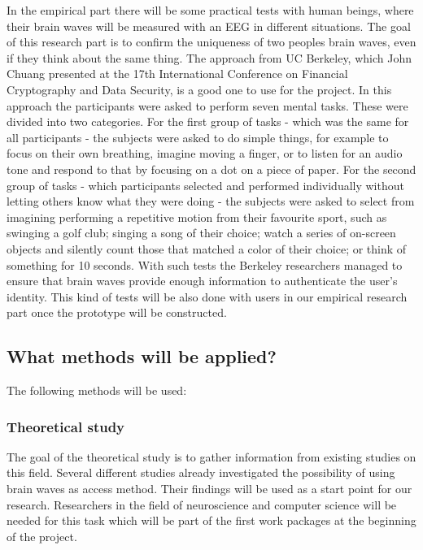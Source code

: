 In the empirical part there will be some practical tests with human beings, where their brain waves will be measured with an EEG in different situations. The goal of this research part is to confirm the uniqueness of two peoples brain waves, even if they think about the same thing. The approach from UC Berkeley, which John Chuang presented at the 17th International Conference on Financial Cryptography and Data Security, is a good one to use for the project. In this approach the participants were asked to perform seven mental tasks. These were divided into two categories. For the first group of tasks - which was the same for all participants - the subjects were asked to do simple things, for example to focus on their own breathing, imagine moving a finger, or to listen for an audio tone and respond to that by focusing on a dot on a piece of paper. For the second group of tasks - which participants selected and performed individually without letting others know what they were doing - the subjects were asked to select from imagining performing a repetitive motion from their favourite sport, such as swinging a golf club; singing a song of their choice; watch a series of on-screen objects and silently count those that matched a color of their choice; or think of something for 10 seconds. \cite{Adhikari13} With such tests the Berkeley researchers managed to ensure that brain waves provide enough information to authenticate the user's identity. This kind of tests will be also done with users in our empirical research part once the prototype will be constructed.

\subsection{What methods will be applied?}
The following methods will be used:

\subsubsection{Theoretical study}
The goal of the theoretical study is to gather information from existing studies on this field. Several different studies already investigated the possibility of using brain waves as access method. Their findings will be used as a start point for our research. Researchers in the field of neuroscience and computer science will be needed for this task which will be part of the first work packages at the beginning of the project.

